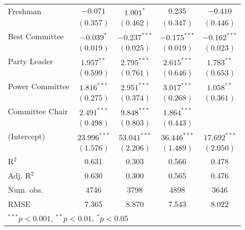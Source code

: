 \documentclass[12pt]{article}
\begin{document}
\begin{table}
\begin{center}
\begin{tabular}{l c c c c }
			Freshman               & $-0.071$       & $1.001^{*}$    & $0.235$        & $-0.410$       \\
			& $(0.357)$      & $(0.462)$      & $(0.347)$      & $(0.446)$      \\
			Best Committee          & $-0.039^{*}$   & $-0.237^{***}$ & $-0.175^{***}$ & $-0.162^{***}$ \\
			& $(0.019)$      & $(0.025)$      & $(0.019)$      & $(0.023)$      \\
			Party Leader                 & $1.957^{**}$   & $2.795^{***}$  & $2.615^{***}$  & $1.783^{**}$   \\
			& $(0.599)$      & $(0.761)$      & $(0.646)$      & $(0.653)$      \\
			Power Committee                  & $1.816^{***}$  & $2.951^{***}$  & $3.017^{***}$  & $1.058^{**}$   \\
			& $(0.275)$      & $(0.374)$      & $(0.268)$      & $(0.361)$      \\
			Committee Chair                  & $2.491^{***}$  & $9.848^{***}$  & $1.864^{***}$  &                \\
			& $(0.498)$      & $(0.803)$      & $(0.443)$      &                \\
			(Intercept)            & $23.996^{***}$ & $53.041^{***}$ & $36.446^{***}$ & $17.692^{***}$ \\
			& $(1.576)$      & $(2.206)$      & $(1.489)$      & $(2.050)$      \\
			\hline
			R$^2$                  & 0.631          & 0.303          & 0.566          & 0.478          \\
			Adj. R$^2$             & 0.630          & 0.300          & 0.565          & 0.476          \\
			Num. obs.              & 4746           & 3798           & 4898           & 3646           \\
			RMSE                   & 7.365          & 8.870          & 7.543          & 8.022          \\
			\hline
			\multicolumn{5}{l}{\scriptsize{$^{***}p<0.001$, $^{**}p<0.01$, $^*p<0.05$}}
		\end{tabular}
	\end{center}
\end{table}
\end{document}
